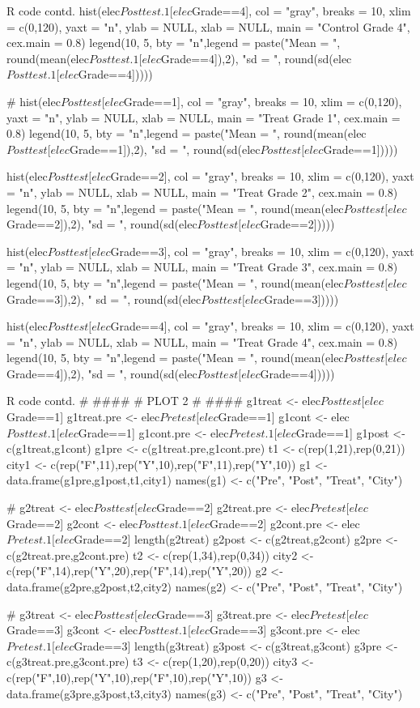 \documentclass{article}
\begin{document}
\begin{sexylisting}{R code contd.}
hist(elec$Posttest.1[elec$Grade==4], col = "gray", 
breaks = 10, xlim = c(0,120), yaxt = "n", ylab = NULL, xlab = NULL, 
main = "Control Grade 4",
     cex.main = 0.8)
legend(10, 5, bty = "n",legend = paste("Mean = ", 
round(mean(elec$Posttest.1[elec$Grade==4]),2), "\n sd = ", 
round(sd(elec$Posttest.1[elec$Grade==4]))))

#
hist(elec$Posttest[elec$Grade==1], col = "gray", breaks = 10, 
xlim = c(0,120), yaxt = "n", ylab = NULL, xlab = NULL, 
main = "Treat Grade 1",
     cex.main = 0.8)
legend(10, 5, bty = "n",legend = paste("Mean = ", 
round(mean(elec$Posttest[elec$Grade==1]),2), "\n sd = ", 
round(sd(elec$Posttest[elec$Grade==1]))))

hist(elec$Posttest[elec$Grade==2], col = "gray", breaks = 10, 
xlim = c(0,120), yaxt = "n", ylab = NULL, xlab = NULL, 
main = "Treat Grade 2",
     cex.main = 0.8)
legend(10, 5, bty = "n",legend = paste("Mean = ", 
round(mean(elec$Posttest[elec$Grade==2]),2), "\n sd = ", 
round(sd(elec$Posttest[elec$Grade==2]))))

hist(elec$Posttest[elec$Grade==3], col = "gray", 
breaks = 10, xlim = c(0,120), yaxt = "n", ylab = NULL, 
xlab = NULL, main = "Treat Grade 3",
     cex.main = 0.8)
legend(10, 5, bty = "n",legend = paste("Mean = ", 
round(mean(elec$Posttest[elec$Grade==3]),2), "\n 
sd = ", round(sd(elec$Posttest[elec$Grade==3]))))

hist(elec$Posttest[elec$Grade==4], col = "gray", 
breaks = 10, xlim = c(0,120), yaxt = "n", 
ylab = NULL, xlab = NULL, main = "Treat Grade 4",
     cex.main = 0.8)
legend(10, 5, bty = "n",legend = 
paste("Mean = ", round(mean(elec$Posttest[elec$Grade==4]),2), 
"\n sd = ", round(sd(elec$Posttest[elec$Grade==4]))))
\end{sexylisting}
\begin{sexylisting}{R code contd.}
# ####
# PLOT 2
# ####
g1treat <- elec$Posttest[elec$Grade==1]
g1treat.pre <- elec$Pretest[elec$Grade==1]
g1cont <- elec$Posttest.1[elec$Grade==1]
g1cont.pre <- elec$Pretest.1[elec$Grade==1]
g1post <- c(g1treat,g1cont)
g1pre <- c(g1treat.pre,g1cont.pre)
t1 <- c(rep(1,21),rep(0,21))
city1 <- c(rep("F",11),rep("Y",10),rep("F",11),rep("Y",10))
g1 <- data.frame(g1pre,g1post,t1,city1)
names(g1) <- c("Pre", "Post", "Treat", "City")

#
g2treat <- elec$Posttest[elec$Grade==2]
g2treat.pre <- elec$Pretest[elec$Grade==2]
g2cont <- elec$Posttest.1[elec$Grade==2]
g2cont.pre <- elec$Pretest.1[elec$Grade==2]
length(g2treat)
g2post <- c(g2treat,g2cont)
g2pre <- c(g2treat.pre,g2cont.pre)
t2 <- c(rep(1,34),rep(0,34))
city2 <- c(rep("F",14),rep("Y",20),rep("F",14),rep("Y",20))
g2 <- data.frame(g2pre,g2post,t2,city2)
names(g2) <- c("Pre", "Post", "Treat", "City")

#
g3treat <- elec$Posttest[elec$Grade==3]
g3treat.pre <- elec$Pretest[elec$Grade==3]
g3cont <- elec$Posttest.1[elec$Grade==3]
g3cont.pre <- elec$Pretest.1[elec$Grade==3]
length(g3treat)
g3post <- c(g3treat,g3cont)
g3pre <- c(g3treat.pre,g3cont.pre)
t3 <- c(rep(1,20),rep(0,20))
city3 <- c(rep("F",10),rep("Y",10),rep("F",10),rep("Y",10))
g3 <- data.frame(g3pre,g3post,t3,city3)
names(g3) <- c("Pre", "Post", "Treat", "City")
\end{sexylisting}
\end{document}
